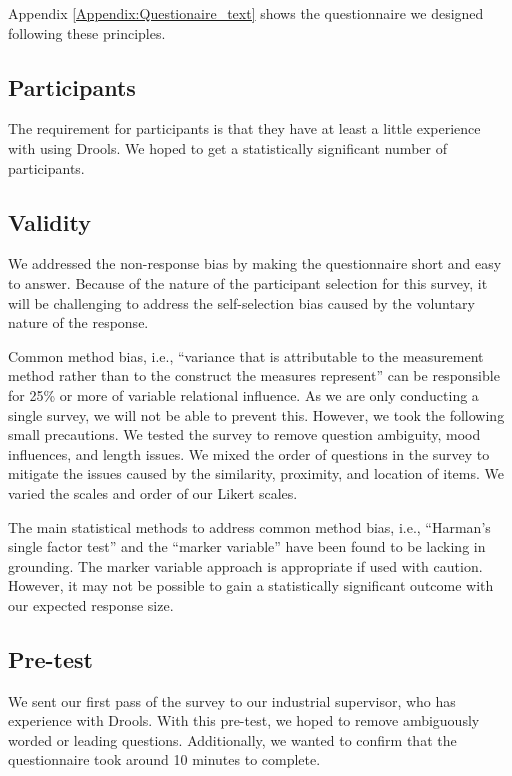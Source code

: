 Appendix \ref{Appendix:Questionaire_text} shows the questionnaire we designed following these principles.


\subsection{Participants}

The requirement for participants is that they have at least a little experience with using Drools.
We hoped to get a statistically significant number of participants.

\subsection{Validity}
We addressed the non-response bias\cite{armstrong1977estimating} by making the questionnaire short and easy to answer.
Because of the nature of the participant selection for this survey, it will be challenging to address the self-selection bias caused by the voluntary nature of the response.

Common method bias, i.e., ``variance that is attributable to the measurement method rather than to the construct the measures represent''\cite{podsakoff2003common} can be responsible for 25\% or more of variable relational influence.
As we are only conducting a single survey, we will not be able to prevent this. 
However, we took the following small precautions.
We tested the survey to remove question ambiguity, mood influences, and length issues.
We mixed the order of questions in the survey to mitigate the issues caused by the similarity, proximity, and location of items.
We varied the scales and order of our Likert scales.

The main statistical methods to address common method bias, i.e., ``Harman's single factor test''\cite{podsakoff2003common} and the ``marker variable''\cite{lindell2001accounting} have been found to be lacking in grounding\cite{gorrell2011countering}.
The marker variable approach is appropriate if used with caution.
However, it may not be possible to gain a statistically significant outcome with our expected response size.

\subsection{Pre-test}
We sent our first pass of the survey to our industrial supervisor, who has experience with Drools.
With this pre-test, we hoped to remove ambiguously worded or leading questions.
Additionally, we wanted to confirm that the questionnaire took around 10 minutes to complete.

